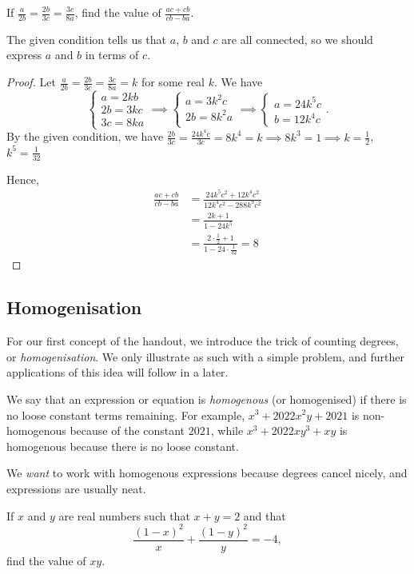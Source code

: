 \documentclass[../jarvis.tex]{subfiles}
\begin{document}
\begin{example}[2016 SMO(J) P24]
    If $\frac{a}{2b}=\frac{2b}{3c}=\frac{3c}{8a}$, find the value of $\frac{ac+cb}{cb-ba}.$
\end{example}
The given condition tells us that $a$, $b$ and $c$ are all connected, so we should express $a$ and $b$ in terms of $c$.

\begin{proof}
    Let $\frac{a}{2b}=\frac{2b}{3c}=\frac{3c}{8a}=k$ for some real $k$. We have
$$ 
\begin{cases}
    a=2kb \\
    2b=3kc \\
    3c=8ka
\end{cases}
\implies
\begin{cases}
    a=3k^2c \\
    2b=8k^2a \\
\end{cases}
\implies
\begin{cases}
    a=24k^5c \\
    b=12k^4c    
\end{cases} 
.$$
By the given condition, we have $\frac{2b}{3c}=\frac{24k^4c}{3c}=8k^4=k \implies 8k^3=1 \implies k=\frac{1}{2}$, $k^5=\frac{1}{32}$

Hence,
\begin{align*}
    \frac{ac+cb}{cb-ba}
    &= \frac{24k^5c^2+12k^4c^2}{12k^4c^2-288k^9c^2} \\
    &= \frac{2k+1}{1-24k^5} \\
    &= \frac{2\cdot\frac{1}{2}+1}{1-24\cdot\frac{1}{32}} = \boxed{8}
\end{align*}
\end{proof}

\subsection{Homogenisation}
For our first concept of the handout, we introduce the trick of counting degrees, or \textit{homogenisation}. We only illustrate as such with a simple problem, and further applications of this idea will follow in a later.

\begin{proposition}
    We say that an expression or equation is \textit{homogenous} (or homogenised) if there is no loose constant terms remaining. For example, $x^3+2022x^2y+2021$ is non-homogenous because of the constant $2021$, while $x^3+2022xy^3+xy$ is homogenous because there is no loose constant. 

    We \textit{want} to work with homogenous expressions because degrees cancel nicely, and expressions are usually neat. 
\end{proposition}
\begin{example}
    If $x$ and $y$ are real numbers such that $x+y=2$ and that
    $$\frac{(1-x)^2}{x}+\frac{(1-y)^2}{y}=-4,$$
    find the value of $xy$.
\end{example}
\end{document}
